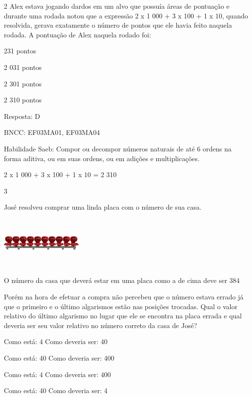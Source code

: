 \begin{escolha}
\num{2} Alex estava jogando dardos em um alvo que possuía áreas de pontuação e
durante uma rodada notou que a expressão 2 x 1 000 + 3 x 100 + 1 x 10,
quando resolvida, gerava exatamente o número de pontos que ele havia
feito naquela rodada. A pontuação de Alex naquela rodado foi:

\begin{escolha}
\item
  231 pontos
\item
  2 031 pontos
\item
  2 301 pontos
\item
  2 310 pontos
\end{escolha}

Resposta: D

BNCC: EF03MA01, EF03MA04

Habilidade Saeb: Compor ou decompor números naturais de até 6 ordens na
forma aditiva, ou em suas ordens, ou em adições e multiplicações.

2 x 1 000 + 3 x 100 + 1 x 10 = 2 310

\num{3}

José resolveu comprar uma linda placa com o número de sua casa.

\includegraphics[width=1.60256in,height=1.03072in]{media/image107.png}

O número da casa que deverá estar em uma placa como a de cima deve ser
384

Porém na hora de efetuar a compra não percebeu que o número estava
errado já que o primeiro e o último algarismos estão nas posições
trocadas. Qual o valor relativo do último algarismo no lugar que ele se
encontra na placa errada e qual deveria ser seu valor relativo no número
correto da casa de José?

\begin{escolha}
\item
  Como está: 4 Como deveria ser: 40
\item
  Como está: 40 Como deveria ser: 400
\item
  Como está: 4 Como deveria ser: 400
\item
  Como está: 40 Como deveria ser: 4
\end{escolha}


\end{escolha}
